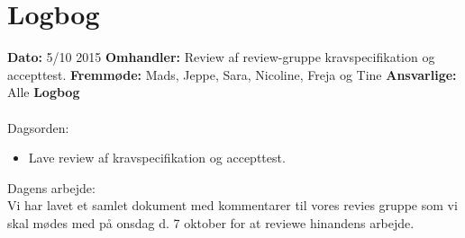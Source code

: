 \chapter{Logbog}

\textbf{Dato:} 5/10 2015 
\textbf{Omhandler:} Review af review-gruppe kravspecifikation og accepttest. 
\textbf{Fremmøde:} Mads, Jeppe, Sara, Nicoline, Freja og Tine
\textbf{Ansvarlige:} Alle
\textbf{Logbog}
\\
\\
Dagsorden:
\begin{itemize}
	\item Lave review af kravspecifikation og accepttest. 
\end{itemize}

Dagens arbejde: \\
Vi har lavet et samlet dokument med kommentarer til vores revies gruppe som vi skal mødes med på onsdag d. 7 oktober for at reviewe hinandens arbejde. \\



